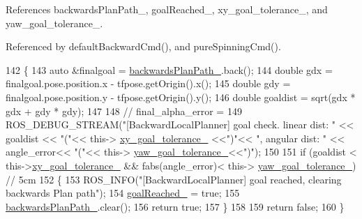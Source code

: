 References backwards\+Plan\+Path\+\_\+, goal\+Reached\+\_\+, xy\+\_\+goal\+\_\+tolerance\+\_\+, and yaw\+\_\+goal\+\_\+tolerance\+\_\+.



Referenced by default\+Backward\+Cmd(), and pure\+Spinning\+Cmd().


\begin{DoxyCode}
142 \{
143     \textcolor{keyword}{auto} &finalgoal = \hyperlink{classcl__move__base__z_1_1backward__local__planner_1_1BackwardLocalPlanner_ad9cde5c85f782cab2ddb4030e3c3f2cf}{backwardsPlanPath\_}.back();
144     \textcolor{keywordtype}{double} gdx = finalgoal.pose.position.x - tfpose.getOrigin().x();
145     \textcolor{keywordtype}{double} gdy = finalgoal.pose.position.y - tfpose.getOrigin().y();
146     \textcolor{keywordtype}{double} goaldist = sqrt(gdx * gdx + gdy * gdy);
147 
148     \textcolor{comment}{// final\_alpha\_error = }
149     ROS\_DEBUG\_STREAM(\textcolor{stringliteral}{"[BackwardLocalPlanner] goal check. linear dist: "} << goaldist << \textcolor{stringliteral}{"("}<< this->
      \hyperlink{classcl__move__base__z_1_1backward__local__planner_1_1BackwardLocalPlanner_aa4ec2c87947a3c08f8278eff052e7c8c}{xy\_goal\_tolerance\_} <<\textcolor{stringliteral}{")"}<< \textcolor{stringliteral}{", angular dist: "} << angle\_error<< \textcolor{stringliteral}{"("}<< this->
      \hyperlink{classcl__move__base__z_1_1backward__local__planner_1_1BackwardLocalPlanner_a9c5104d328041fcde5a3c02664abad48}{yaw\_goal\_tolerance\_}<<\textcolor{stringliteral}{")"});
150 
151     \textcolor{keywordflow}{if} (goaldist < this->\hyperlink{classcl__move__base__z_1_1backward__local__planner_1_1BackwardLocalPlanner_aa4ec2c87947a3c08f8278eff052e7c8c}{xy\_goal\_tolerance\_} &&  fabs(angle\_error)< this->
      \hyperlink{classcl__move__base__z_1_1backward__local__planner_1_1BackwardLocalPlanner_a9c5104d328041fcde5a3c02664abad48}{yaw\_goal\_tolerance\_}) \textcolor{comment}{// 5cm}
152     \{
153         ROS\_INFO(\textcolor{stringliteral}{"[BackwardLocalPlanner] goal reached, clearing backwards Plan path"});
154         \hyperlink{classcl__move__base__z_1_1backward__local__planner_1_1BackwardLocalPlanner_ad443c52ef585a8eab0364f0909222f51}{goalReached\_} = \textcolor{keyword}{true};
155         \hyperlink{classcl__move__base__z_1_1backward__local__planner_1_1BackwardLocalPlanner_ad9cde5c85f782cab2ddb4030e3c3f2cf}{backwardsPlanPath\_}.clear();
156         \textcolor{keywordflow}{return} \textcolor{keyword}{true};
157     \}
158 
159     \textcolor{keywordflow}{return} \textcolor{keyword}{false};
160 \}
\end{DoxyCode}
